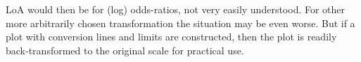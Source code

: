 \documentclass[Main.tex]{subfiles}
\begin{document}
LoA would then be for (log) odds-ratios, not very easily understood. For other more arbitrarily
chosen transformation the situation may be even worse. But if a plot with conversion lines and limits are constructed, then the
plot is readily back-transformed to the original scale for practical use.




\end{document}
